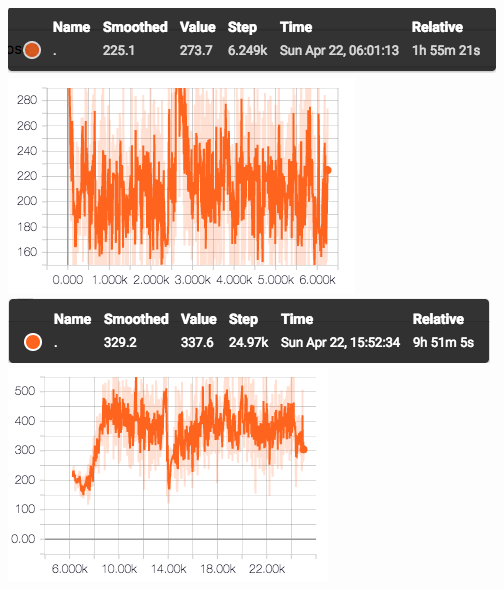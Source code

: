 \documentclass[12pt]{report}
\begin{document}
\begin{center}
\includegraphics[scale=0.5]{lr_0_001_attn_train_25k_result.png} \\
\vspace{3mm}
\includegraphics[scale=0.6]{lr_0_001_attn_train_25k.png}\\
\vspace{3mm}
\includegraphics[scale=0.5]{lr_0_001_attn_greedy_25k_result.png} \\
\vspace{3mm}
\includegraphics[scale=0.7]{lr_0_001_attn_greedy_25k.png} 
\end{center}
 
\end{document}
